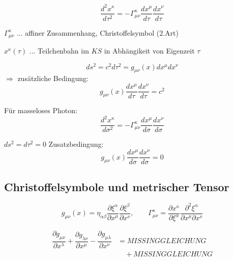 \documentclass[a4paper, 11pt]{article}
\numberwithin{equation}{section}
\begin{document}
\begin{equation}
\boxed{
\dfrac{d^2x^\kappa}{d\tau^2} = -\Gamma^\kappa_{\mu \nu} \dfrac{dx^\mu}{d\tau} \dfrac{dx^\nu}{d\tau}}
\end{equation}

$\Gamma^\kappa_{\mu \nu}$ $...$ affiner Zusammenhang, Christoffelsymbol (2.Art)

$x^\kappa (\tau)$ $...$ Teilchenbahn im $KS$ in Abhängikeit von Eigenzeit $\tau$

\begin{equation*}
ds^2 = c^2 d\tau^2 = g_{\mu \nu} (x) dx^\mu dx^\nu
\end{equation*}
$\Rightarrow$ zusätzliche Bedingung:
\begin{equation}
g_{\mu \nu} (x) \dfrac{dx^\mu}{d \tau} \dfrac{dx^\nu}{d \tau} = c^2
\end{equation}


Für masseloses Photon:
\begin{equation}
\dfrac{d^2 x^\kappa}{d \sigma^2} = - \Gamma^\kappa_{\mu \nu} \dfrac{dx^\mu}{d\sigma} \dfrac{dx^\nu}{d\sigma}
\end{equation}

$ds^2 = d\tau^2 = 0$ Zusatzbedingung:
\begin{equation}
g_{\mu \nu} (x) \dfrac{dx^\mu}{d \sigma} \dfrac{dx^\nu}{d \sigma} = 0
\end{equation}

\subsection*{Christoffelsymbole und metrischer Tensor}

\begin{equation}
g_{\mu \nu} (x) = \eta_{\alpha \beta} \dfrac{\partial\xi^\alpha}{\partial x ^\mu} \dfrac{\partial \xi^\beta}{\partial x^\nu}, \qquad 
\Gamma^\kappa_{\mu \nu} = \dfrac{\partial x^\kappa}{\partial \xi^\alpha} \dfrac{\partial^2 \xi^\alpha}{\partial x^\mu \partial x^\nu}
\end{equation}


\begin{equation}
\begin{aligned}
\dfrac{\partial g_{\mu \nu}}{\partial x^\lambda} + \dfrac{\partial g_{\lambda \nu}}{\partial x^\mu} - \dfrac{\partial g_{\mu \lambda}}{\partial x^\nu} &= MISSING GLEICHUNG\\
&\quad + MISSING GLEICHUNG
\end{aligned}
\end{equation}
\end{document}
